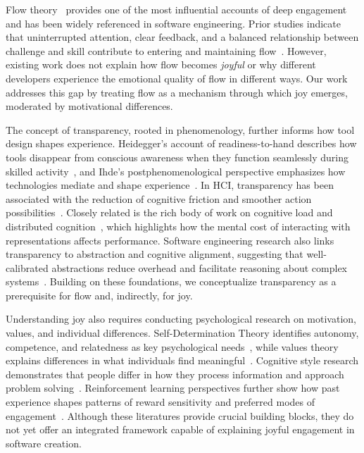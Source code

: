 \documentclass[12pt]{elsarticle}
\begin{document}
Flow theory~\cite{csikszentmihalyi1990flow} provides one of the most influential 
accounts of deep engagement and has been widely referenced in software 
engineering. Prior studies indicate that uninterrupted attention, clear feedback, and a 
balanced relationship between challenge and skill contribute to entering and 
maintaining flow~\cite{ford2015exploring}. However, existing work does not explain 
how flow becomes \emph{joyful} or why different developers experience the 
emotional quality of flow in different ways. Our work addresses this gap by 
treating flow as a mechanism through which joy emerges, moderated by 
motivational differences.

The concept of transparency, rooted in phenomenology, further informs how tool 
design shapes experience. Heidegger’s account of readiness-to-hand describes how 
tools disappear from conscious awareness when they function seamlessly 
during skilled activity~\cite{heidegger1962being}, and Ihde’s 
postphenomenological perspective emphasizes how technologies mediate and shape 
experience~\cite{ihde1990technology}. In HCI, transparency has been associated with 
the reduction of cognitive friction and smoother action 
possibilities~\cite{dourish2001action}. Closely related is the rich body of 
work on cognitive load and distributed cognition~\cite{hutchins1995cognition, 
sweller1988cognitive}, which highlights how the mental cost of interacting with 
representations affects performance. Software engineering research also links 
transparency to abstraction and cognitive alignment, suggesting that 
well-calibrated abstractions reduce overhead and facilitate reasoning 
about complex systems~\cite{kramer2007abstraction}. 
Building on these foundations, we conceptualize transparency as a prerequisite 
for flow and, indirectly, for joy.

Understanding joy also requires conducting psychological research on 
motivation, values, and individual differences. Self-Determination Theory 
identifies autonomy, competence, and relatedness as key psychological 
needs~\cite{ryan2000selfdetermination}, while values theory explains differences in what 
individuals find meaningful~\cite{schwartz1992universals}. Cognitive style 
research demonstrates that people differ in how they process information and 
approach problem solving~\cite{kozhevnikov2007cognitive}. Reinforcement learning 
perspectives further show how past experience shapes patterns of reward 
sensitivity and preferred modes of engagement~\cite{anderson2004learning}. 
Although these literatures provide crucial building blocks, they do not yet 
offer an integrated framework capable of explaining joyful engagement in 
software creation.
\end{document}

